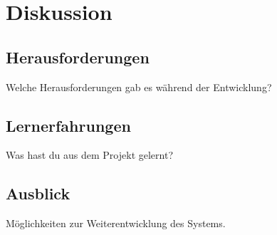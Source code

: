 \chapter{Diskussion}
\section{Herausforderungen}
Welche Herausforderungen gab es während der Entwicklung?
\section{Lernerfahrungen}
Was hast du aus dem Projekt gelernt?

\section{Ausblick}
Möglichkeiten zur Weiterentwicklung des Systems.